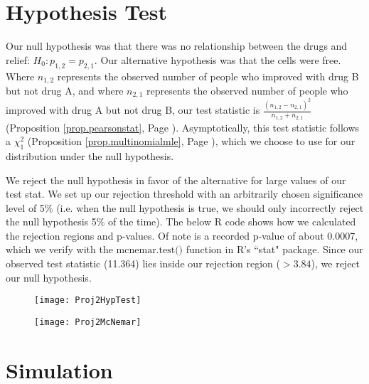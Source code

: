 \documentclass[12pt, letterpaper]{article}
\theoremstyle{definition}
\numberwithin{equation}{section}
\newcommand{\myprop}[1]{(Proposition \ref{#1}, Page \pageref{#1})}
\newcommand{\+}[1]{+_{\scalebox{.375}{#1}}}
\newcommand{\1}{\mathbbm{1}}
\begin{document}
\newpage
\section{Hypothesis Test}\label{section.hypothesistest}

Our null hypothesis was that there was no relationship between the drugs and relief: $H_0: p_{1,2}=p_{2,1}$. Our alternative hypothesis was that the cells were free. Where $n_{1,2}$ represents the observed number of people who improved with drug B but not drug A, and where $n_{2,1}$ represents the observed number of people who improved with drug A but not drug B, our test statistic is $\frac{(n_{1,2}-n_{2,1})^2}{n_{1,2}+n_{2,1}}$ \myprop{prop.pearsonstat}. Asymptotically, this test statistic follows a $\chi_1^2$ \myprop{prop.multinomialmle}, which we choose to use for our distribution under the null hypothesis. 
\vspace{\baselineskip}

We reject the null hypothesis in favor of the alternative for large values of our test stat. We set up our rejection threshold with an arbitrarily chosen significance level of 5\% (i.e. when the null hypothesis is true, we should only incorrectly reject the null hypothesis 5\% of the time). The below R code shows how we calculated the rejection regions and p-values. Of note is a recorded p-value of about 0.0007, which we verify with the $\text{mcnemar.test()}$ function in R's ``stat" package. Since our observed test statistic (11.364) lies inside our rejection region ($>3.84$), we reject our null hypothesis.

\begin{figure}[H]
	\centering
	\texttt{[image: Proj2HypTest]}
	\label{figure.Proj2HyptTest}
\end{figure}
\vspace{-0.65cm}

\begin{figure}[H]
	\centering
	\texttt{[image: Proj2McNemar]}
	\label{figure.McNemar}
\end{figure}



\newpage\section{Simulation}\label{section.simulation}
\end{document}
